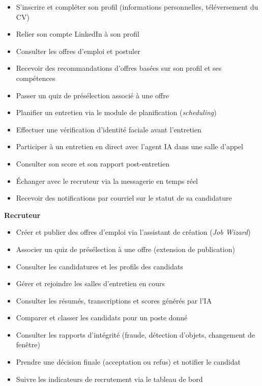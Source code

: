 \begin{itemize}
  \item S’inscrire et compléter son profil (informations personnelles, téléversement du CV)
  \item Relier son compte LinkedIn à son profil
  \item Consulter les offres d’emploi et postuler
  \item Recevoir des recommandations d’offres basées sur son profil et ses compétences
  \item Passer un quiz de présélection associé à une offre
  \item Planifier un entretien via le module de planification (\textit{scheduling})
  \item Effectuer une vérification d’identité faciale avant l’entretien
  \item Participer à un entretien en direct avec l’agent IA dans une salle d’appel
  \item Consulter son score et son rapport post-entretien
  \item Échanger avec le recruteur via la messagerie en temps réel
  \item Recevoir des notifications par courriel sur le statut de sa candidature
\end{itemize}

\noindent\textbf{Recruteur}

\begin{itemize}
  \item Créer et publier des offres d’emploi via l’assistant de création (\textit{Job Wizard})
  \item Associer un quiz de présélection à une offre (extension de publication)
  \item Consulter les candidatures et les profils des candidats
  \item Gérer et rejoindre les salles d’entretien en cours
  \item Consulter les résumés, transcriptions et scores générés par l’IA
  \item Comparer et classer les candidats pour un poste donné
  \item Consulter les rapports d’intégrité (fraude, détection d’objets, changement de fenêtre)
  \item Prendre une décision finale (acceptation ou refus) et notifier le candidat
  \item Suivre les indicateurs de recrutement via le tableau de bord
\end{itemize}

